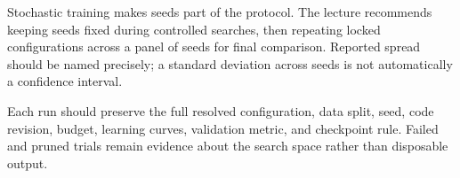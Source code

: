 \documentclass{article}
\begin{document}
Stochastic training makes seeds part of the protocol. The lecture recommends keeping
seeds fixed during controlled searches, then repeating locked configurations across a
panel of seeds for final comparison. Reported spread should be named precisely; a
standard deviation across seeds is not automatically a confidence interval.

Each run should preserve the full resolved configuration, data split, seed, code
revision, budget, learning curves, validation metric, and checkpoint rule. Failed and
pruned trials remain evidence about the search space rather than disposable output.

\end{document}
